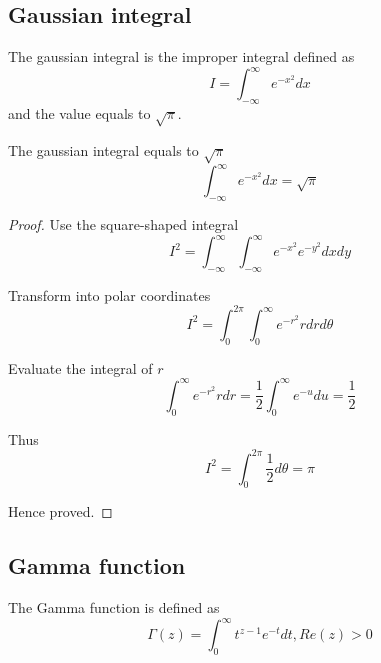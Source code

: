 \subsection{Gaussian integral}
The gaussian integral is the improper integral defined as
\begin{equation}
    \label{Equation: Gaussian integral}
    I = \int_{-\infty}^{\infty} e^{-x^2} dx
\end{equation}
and the value equals to $\sqrt{\pi}$.

\begin{lemma}
    \label{Lemma: Gaussian integral}
    The gaussian integral equals to $\sqrt{\pi}$
    \begin{equation*}
        \int_{-\infty}^{\infty} e^{-x^2} dx = \sqrt{\pi}
    \end{equation*}

    \begin{proof}
        Use the square-shaped integral
        \begin{equation*}
            I^2 = \int_{-\infty}^{\infty} \int_{-\infty}^{\infty} e^{-x^2} e^{-y^2} dx dy
        \end{equation*}

        Transform into polar coordinates
        \begin{equation*}
            I^2 = \int_{0}^{2\pi} \int_{0}^{\infty} e^{-r^2} r dr d\theta
        \end{equation*}

        Evaluate the integral of $r$
        \begin{equation*}
            \int_{0}^{\infty} e^{-r^2} r dr = \frac{1}{2} \int_{0}^{\infty} e^{-u} du = \frac{1}{2}
        \end{equation*}

        Thus
        \begin{equation*}
            I^2 = \int_{0}^{2\pi} \frac{1}{2} d\theta = \pi
        \end{equation*}

        Hence proved.

    \end{proof}
\end{lemma}

\subsection{Gamma function}
The Gamma function is defined as
\begin{equation}
    \label{Equation: Gamma function}
    \Gamma(z) = \int_0^\infty t^{z-1} e^{-t} dt, Re(z) > 0
\end{equation}

